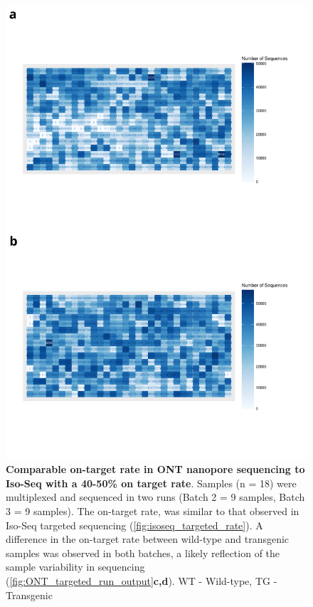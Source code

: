 \begin{figure}[ht]
	\centering
	\includegraphics[page=5,trim={0 27cm 0 0cm},clip,scale = 0.55]{Figures/ONTTargetedTranscriptome.pdf}
	\captionsetup{width=0.95\textwidth}
	\caption[On-Target rate in ONT nanopore runs]%
	{\textbf{Comparable on-target rate in ONT nanopore sequencing to Iso-Seq with a 40-50\% on target rate}. Samples (n = 18) were multiplexed and sequenced in two runs (Batch 2 = 9 samples, Batch 3 = 9 samples). The on-target rate, was similar to that observed in Iso-Seq targeted sequencing (\cref{fig:isoseq_targeted_rate}). A difference in the on-target rate between wild-type and transgenic samples was observed in both batches, a likely reflection of the sample variability in sequencing (\cref{fig:ONT_targeted_run_output}\textbf{c,d}). WT - Wild-type, TG - Transgenic}
	\label{fig:ont_targeted_rate}
\end{figure}

